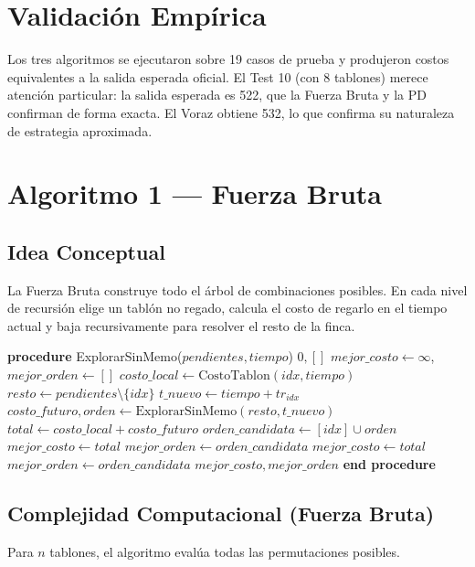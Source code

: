 \documentclass[conference, a4paper]{IEEEtran}
\begin{document}
\section{Validación Empírica}
Los tres algoritmos se ejecutaron sobre 19 casos de prueba y produjeron costos equivalentes a la salida esperada oficial. El Test 10 (con 8 tablones) merece atención particular: la salida esperada es 522, que la Fuerza Bruta y la PD confirman de forma exacta. El Voraz obtiene 532, lo que confirma su naturaleza de estrategia aproximada.

\section{Algoritmo 1 — Fuerza Bruta}
\subsection{Idea Conceptual}
La Fuerza Bruta construye todo el árbol de combinaciones posibles. En cada nivel de recursión elige un tablón no regado, calcula el costo de regarlo en el tiempo actual y baja recursivamente para resolver el resto de la finca.

\begin{algorithm}
\caption{Fuerza Bruta: Encontrar Óptimo}
\begin{algorithmic}[1]
\STATE \textbf{procedure} ExplorarSinMemo($pendientes, tiempo$)
        \RETURN $0, []$
    \ENDIF
    \STATE $mejor\_costo \gets \infty$, $mejor\_orden \gets []$
        \STATE $costo\_local \gets \text{CostoTablon}(idx, tiempo)$
        \STATE $resto \gets pendientes \setminus \{idx\}$
        \STATE $t\_nuevo \gets tiempo + tr_{idx}$
        \STATE $costo\_futuro, orden \gets \text{ExplorarSinMemo}(resto, t\_nuevo)$
        \STATE $total \gets costo\_local + costo\_futuro$
        \STATE $orden\_candidata \gets [idx] \cup orden$
            \STATE $mejor\_costo \gets total$
            \STATE $mejor\_orden \gets orden\_candidata$
            \STATE $mejor\_costo \gets total$
            \STATE $mejor\_orden \gets orden\_candidata$
        \ENDIF
    \ENDFOR
    \RETURN $mejor\_costo, mejor\_orden$
\STATE \textbf{end procedure}
\end{algorithmic}
\end{algorithm}

\subsection{Complejidad Computacional (Fuerza Bruta)}
Para $n$ tablones, el algoritmo evalúa todas las permutaciones posibles.
\end{document}
